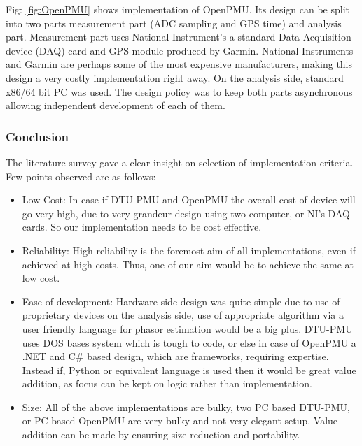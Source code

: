  Fig: \ref{fig:OpenPMU} shows implementation of OpenPMU. Its design can be split into two parts measurement part (ADC sampling and GPS time) and analysis part. Measurement part uses National Instrument's a standard Data Acquisition device (DAQ) card and GPS module produced by Garmin. National Instruments  and Garmin are perhaps some of the most expensive manufacturers, making this design a very costly implementation right away. On the analysis side, standard x86/64 bit PC was used. The design policy was to keep both parts asynchronous allowing independent development of each of them.
 
 \subsubsection{Conclusion}
 The literature survey gave a clear insight on selection of implementation criteria. Few points observed are as follows:
 \begin{itemize}
 	\item Low Cost: In case if DTU-PMU and OpenPMU the overall cost of device will go very high, due to very grandeur design using two computer, or NI's DAQ cards. So our implementation needs to be cost effective.
 	\item Reliability: High reliability is the foremost aim of all implementations, even if achieved at high costs.  Thus, one of our aim would be to achieve the same at low cost.
 	\item Ease of development: Hardware side design was quite simple due to use of proprietary devices on the analysis side, use of appropriate algorithm via a user friendly language for phasor estimation would be a big plus. DTU-PMU uses DOS bases system which is tough to code, or else in case of OpenPMU a .NET and C\# based design, which are frameworks, requiring  expertise. Instead if, Python or equivalent language is used then it would be great value addition, as focus can be kept on logic rather than implementation.
 	\item Size: All of the above implementations are bulky, two PC based DTU-PMU, or PC based OpenPMU are very bulky and not very elegant setup. Value addition can be made by ensuring size reduction and portability.
 \end{itemize} 
 
